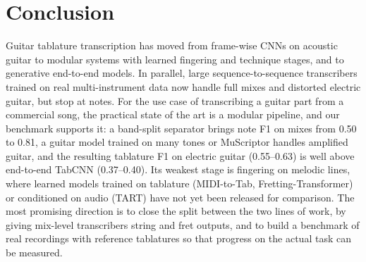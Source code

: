 \section{Conclusion}
\label{sec:conclusion}

Guitar tablature transcription has moved from frame-wise CNNs on acoustic
guitar to modular systems with learned fingering and technique stages, and to
generative end-to-end models. In parallel, large sequence-to-sequence
transcribers trained on real multi-instrument data now handle full mixes and
distorted electric guitar, but stop at notes. For the use case of
transcribing a guitar part from a commercial song, the practical state of the
art is a modular pipeline, and our benchmark supports it: a band-split
separator brings note F1 on mixes from 0.50 to 0.81, a guitar model trained
on many tones or MuScriptor handles amplified guitar, and the resulting
tablature F1 on electric guitar (0.55--0.63) is well above end-to-end TabCNN
(0.37--0.40). Its weakest stage is fingering on melodic lines, where learned
models trained on tablature (MIDI-to-Tab, Fretting-Transformer) or conditioned
on audio (TART) have not yet been released for comparison. The most promising
direction is to close the split between the two lines of work, by giving
mix-level transcribers string and fret outputs, and to build a benchmark of
real recordings with reference tablatures so that progress on the actual task
can be measured.
